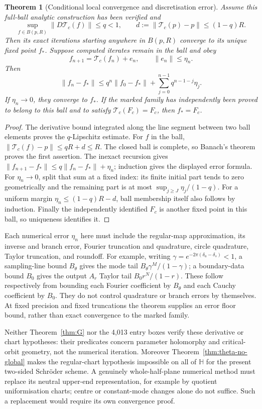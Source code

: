 \documentclass[11pt]{article}
\newtheorem{theorem}{Theorem}
\newcommand{\HH}{\mathbb H}
\begin{document}
\begin{theorem}[Conditional local convergence and discretisation error]
\label{thm:theta-local}
Assume this full-ball analytic construction has been verified and
\[
 \sup_{f\in B(p,R)}\|D\mathcal T_c(f)\|\le q<1,
 \qquad d:=\|\mathcal T_c(p)-p\|\le(1-q)R.
\]
Then its exact iterations starting anywhere in $B(p,R)$ converge to
its unique fixed point $f_*$. Suppose computed iterates remain in the
ball and obey
\[
 f_{n+1}=\mathcal T_c(f_n)+e_n,\qquad \|e_n\|\le\eta_n.
\]
Then
\[
 \|f_n-f_*\|\le q^n\|f_0-f_*\|
       +\sum_{j=0}^{n-1}q^{n-1-j}\eta_j.
\]
If $\eta_n\to0$, they converge to $f_*$. If the marked family has
independently been proved to belong to this ball and to satisfy
$\mathcal T_c(F_c)=F_c$, then $f_*=F_c$.
\end{theorem}
\begin{proof}
The derivative bound integrated along the line segment between two
ball elements proves the $q$-Lipschitz estimate. For $f$ in the ball,
$\|\mathcal T_c(f)-p\|\le qR+d\le R$. The closed ball is complete,
so Banach's theorem proves the first assertion. The inexact recursion
gives $\|f_{n+1}-f_*\|\le q\|f_n-f_*\|+\eta_n$; induction gives
the displayed error formula. For $\eta_n\to0$, split that sum at a
fixed index: its finite initial part tends to zero geometrically and
the remaining part is at most $\sup_{j\ge J}\eta_j/(1-q)$.
For a uniform margin $\eta_n\le(1-q)R-d$, ball membership itself
also follows by induction. Finally the independently identified
$F_c$ is another fixed point in this ball, so uniqueness identifies it.
\end{proof}

Each numerical error $\eta_n$ here must include the regular-map
approximation, its inverse and branch error, Fourier truncation and
quadrature, circle quadrature, Taylor truncation, and roundoff.
For example, writing $\gamma=e^{-2\pi(\delta_a-\delta_s)}<1$,
a sampling-line bound $B_\theta$ gives the mode tail
$B_\theta\gamma^M/(1-\gamma)$; a boundary-data bound $B_0$ gives
the output $A_r$ Taylor tail $B_0r^N/(1-r)$.
These follow respectively from bounding each Fourier coefficient by
$B_\theta$ and each Cauchy coefficient by $B_0$.
They do not control quadrature or branch errors by themselves.
At fixed precision and fixed truncations the theorem supplies an error
floor bound, rather than exact convergence to the marked family.

Neither Theorem~\ref{thm:G} nor the 4,013 entry boxes verify these
derivative or chart hypotheses: their predicates concern parameter
holomorphy and critical-orbit geometry, not the numerical iteration.
Moreover Theorem~\ref{thm:theta-no-global} makes the regular-chart
hypothesis impossible on all of $\HH$ for the present two-sided
Schr\"oder scheme. A genuinely whole-half-plane numerical method must
replace its neutral upper-end representation, for example by quotient
uniformisation charts; centre or constant-mode changes alone do not
suffice. Such a replacement would require its own convergence proof.
\end{document}
